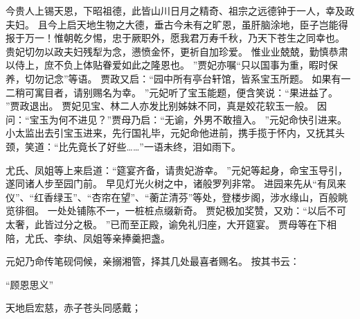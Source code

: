 今贵人上锡天恩，下昭祖德，此皆山川日月之精奇、祖宗之远德钟于一人，幸及政夫妇。
且今上启天地生物之大德，垂古今未有之旷恩，虽肝脑涂地，臣子岂能得报于万一！惟朝乾夕惕，忠于厥职外，愿我君万寿千秋，乃天下苍生之同幸也。
贵妃切勿以政夫妇残犁为念，懑愤金怀，更祈自加珍爱。
惟业业兢兢，勤慎恭肃以侍上，庶不负上体贴眷爱如此之隆恩也。
”贾妃亦嘱“只以国事为重，暇时保养，切勿记念”等语。
贾政又启：“园中所有亭台轩馆，皆系宝玉所题。
如果有一二稍可寓目者，请别赐名为幸。
”元妃听了宝玉能题，便含笑说：“果进益了。
”贾政退出。
贾妃见宝、林二人亦发比别姊妹不同，真是姣花软玉一般。
因问：“宝玉为何不进见？”贾母乃启：“无谕，外男不敢擅入。
”元妃命快引进来。
小太监出去引宝玉进来，先行国礼毕，元妃命他进前，携手揽于怀内，又抚其头颈，笑道：“比先竟长了好些……”一语未终，泪如雨下。
\par
尤氏、凤姐等上来启道：“筵宴齐备，请贵妃游幸。
”元妃等起身，命宝玉导引，遂同诸人步至园门前。
早见灯光火树之中，诸般罗列非常。
进园来先从“有凤来仪”、“红香绿玉”、“杏帘在望”、“蘅芷清芬”等处，登楼步阁，涉水缘山，百般眺览徘徊。
一处处铺陈不一，一桩桩点缀新奇。
贾妃极加奖赞，又劝：“以后不可太奢，此皆过分之极。
”已而至正殿，谕免礼归座，大开筵宴。
贾母等在下相陪，尤氏、李纨、凤姐等亲捧羹把盏。
\par
元妃乃命传笔砚伺候，亲搦湘管，择其几处最喜者赐名。
按其书云：\par
\hop
“顾恩思义”\par
天地启宏慈，赤子苍头同感戴；\par
